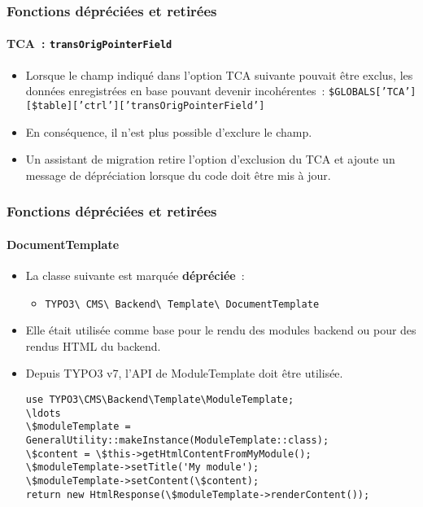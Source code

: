 \begin{frame}[fragile]
	\frametitle{Fonctions dépréciées et retirées}
	\framesubtitle{TCA~: \texttt{transOrigPointerField}}

	\begin{itemize}
		\item Lorsque le champ indiqué dans l'option TCA suivante pouvait être exclus,
			les données enregistrées en base pouvant devenir incohérentes~:
			\small
				\texttt{\$GLOBALS['TCA'][\$table]['ctrl']['transOrigPointerField']}
			\normalsize

		\item En conséquence, il n'est plus possible d'exclure le champ.
		\item Un assistant de migration retire l'option d'exclusion du TCA et ajoute
			un message de dépréciation lorsque du code doit être mis à jour.
	\end{itemize}

\end{frame}


\begin{frame}[fragile]
	\frametitle{Fonctions dépréciées et retirées}
	\framesubtitle{DocumentTemplate}

	\lstset{basicstyle=\tiny\ttfamily}

	\begin{itemize}
		\item La classe suivante est marquée \textbf{dépréciée}~:

		\begin{itemize}
			\item \texttt{TYPO3\textbackslash
				CMS\textbackslash
				Backend\textbackslash
				Template\textbackslash
				DocumentTemplate}
		\end{itemize}

		\item Elle était utilisée comme base pour le rendu des modules backend ou pour des rendus HTML du backend.
		\item Depuis TYPO3 v7, l'API de ModuleTemplate doit être utilisée.
\begin{lstlisting}
use TYPO3\CMS\Backend\Template\ModuleTemplate;
\ldots
\$moduleTemplate = GeneralUtility::makeInstance(ModuleTemplate::class);
\$content = \$this->getHtmlContentFromMyModule();
\$moduleTemplate->setTitle('My module');
\$moduleTemplate->setContent(\$content);
return new HtmlResponse(\$moduleTemplate->renderContent());
\end{lstlisting}

	\end{itemize}

\end{frame}

